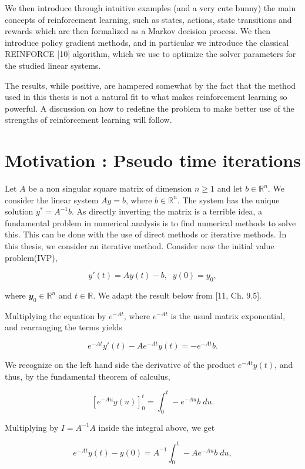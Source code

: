 \documentclass[
  letterpaper,
]{report}
\theoremstyle{definition}
\theoremstyle{plain}
\theoremstyle{definition}
\theoremstyle{remark}
\begin{document}
We then introduce through intuitive examples (and a very cute bunny) the
main concepts of reinforcement learning, such as states, actions, state
transitions and rewards which are then formalized as a Markov decision
process. We then introduce policy gradient methods, and in particular we
introduce the classical REINFORCE {[}10{]} algorithm, which we use to
optimize the solver parameters for the studied linear systems.

The results, while positive, are hampered somewhat by the fact that the
method used in this thesis is not a natural fit to what makes
reinforcement learning so powerful. A discussion on how to redefine the
problem to make better use of the strengths of reinforcement learning
will follow.


\chapter{Motivation : Pseudo time
iterations}\label{motivation-pseudo-time-iterations}

Let \(A\) be a non singular square matrix of dimension \(n\geq 1\) and
let \(b\in\mathbb{R}^n\). We consider the linear system \(Ay = b\),
where \(b \in \mathbb{R}^n\). The system has the unique solution
\(y^* = A^{-1}b\). As directly inverting the matrix is a terrible idea,
a fundamental problem in numerical analysis is to find numerical methods
to solve this. This can be done with the use of direct methods or
iterative methods. In this thesis, we consider an iterative method.
Consider now the initial value problem(IVP),

\[
y'(t) = Ay(t)- b, \; \;  y(0) = y_0,
\]

where \(\mathbfit{y}_0\in \mathbb{R}^n\) and \(t\in \mathbb{R}\). We
adapt the result below from {[}11, Ch. 9.5{]}.

Multiplying the equation by \(e^{-At}\), where \(e^{-At}\) is the usual
matrix exponential, and rearranging the terms yields

\[
e^{-At}y'(t) - Ae^{-At}y(t) = -e^{-At}b.
\]

We recognize on the left hand side the derivative of the product
\(e^{-At}y(t)\), and thus, by the fundamental theorem of calculus,

\[
\left[ e^{-Au}y(u)\right]_0^t = \int_0^t -e^{-Au}b \; du.
\]

Multiplying by \(I = A^{-1}A\) inside the integral above, we get

\[
e^{-At}y(t) - y(0) = A^{-1} \int_0^t -Ae^{-Au}b \; du,
\]
\end{document}
